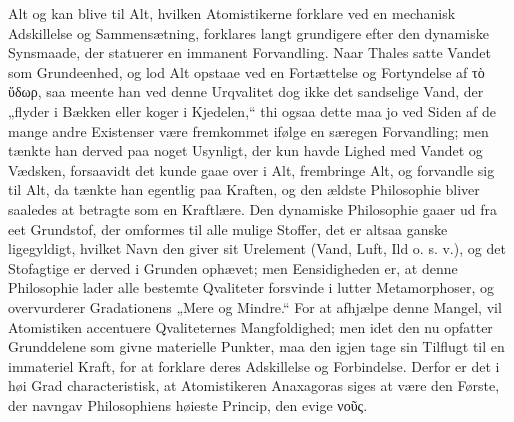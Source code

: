 \documentclass[12pt]{book}
\newcommand{\opage}[1]{\marginnote{\footnotesize\textit{[#1]}}}
\begin{document}
Alt og kan blive til Alt, hvilken Atomistikerne forklare ved en mechanisk Adskillelse og
Sammensætning, forklares langt grundigere efter den dynamiske Synsmaade, der statuerer en
immanent Forvandling. Naar Thales satte Vandet som Grundeenhed, og lod Alt opstaae ved en
Fortættelse og Fortyndelse af τὸ ὕδωρ, saa meente han ved denne Urqvalitet dog ikke det
sandselige Vand, der „flyder i Bækken eller koger i Kjedelen,“ thi ogsaa dette maa jo ved Siden
af de mange andre Existenser være fremkommet ifølge en særegen Forvandling; men tænkte han
derved paa noget Usynligt, der kun havde Lighed med Vandet og Vædsken, forsaavidt det kunde
gaae over i Alt, frembringe Alt, og forvandle sig til Alt, da tænkte han egentlig paa Kraften,
og den ældste Philosophie bliver saaledes at betragte som en Kraftlære. Den dynamiske
Philosophie gaaer ud fra eet Grundstof, der omformes til alle mulige Stoffer, det er altsaa
ganske ligegyldigt, hvilket Navn den giver sit Urelement (Vand, Luft, Ild o. s. v.), og det
Stofagtige er derved i Grunden ophævet; men Eensidigheden er, at denne Philosophie lader alle
bestemte Qvaliteter forsvinde i lutter Metamorphoser, og overvurderer Gradationens „Mere og
Mindre.“ For at afhjælpe denne Mangel, vil Atomistiken accentuere Qvaliteternes Mangfoldighed;
men idet den nu opfatter Grunddelene som givne materielle Punkter, maa den igjen tage sin
Tilflugt til en immateriel Kraft, for at forklare deres Adskillelse og Forbindelse. Derfor er
det i høi Grad characteristisk, at Atomistikeren Anaxagoras siges at være den
\opage{141} %
Første, der navngav Philosophiens høieste Princip, den evige νοῦς.
\end{document}
